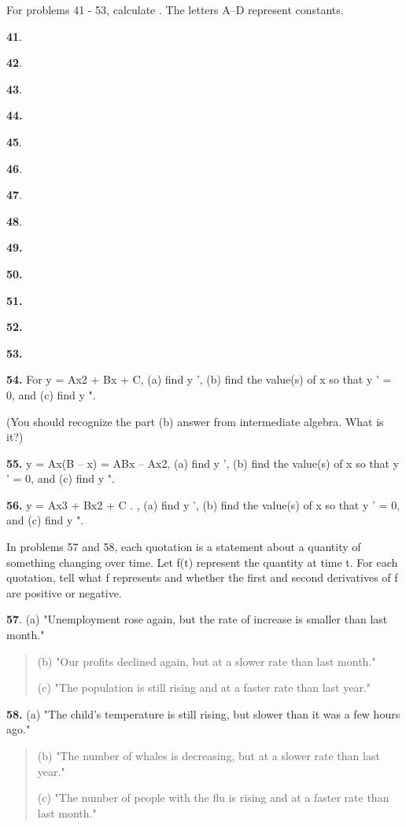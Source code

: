 For problems 41 - 53, calculate . The letters A--D represent constants.

\textbf{41}.

\textbf{42}.

\textbf{43}.

\textbf{44.}

\textbf{45}.

\textbf{46}.

\textbf{47}.

\textbf{48}.

\textbf{49.}

\textbf{50.}

\textbf{51.}

\textbf{52.}

\textbf{53.}

\textbf{54.} For y = Ax2 + Bx + C, (a) find y ', (b) find the value(s)
of x so that y ' = 0, and (c) find y ".

(You should recognize the part (b) answer from intermediate algebra.
What is it?)

\textbf{55.} y = Ax(B -- x) = ABx -- Ax2, (a) find y ', (b) find the
value(s) of x so that y ' = 0, and (c) find y ".

\textbf{56.} y = Ax3 + Bx2 + C . , (a) find y ', (b) find the value(s)
of x so that y ' = 0, and (c) find y ".

In problems 57 and 58, each quotation is a statement about a quantity of
something changing over time. Let f(t) represent the quantity at time t.
For each quotation, tell what f represents and whether the first and
second derivatives of f are positive or negative.

\textbf{57}. (a) "Unemployment rose again, but the rate of increase is
smaller than last month."

\begin{quote}
(b) "Our profits declined again, but at a slower rate than last month."

(c) "The population is still rising and at a faster rate than last
year."
\end{quote}

\textbf{58.} (a) "The child's temperature is still rising, but slower
than it was a few hours ago."

\begin{quote}
(b) "The number of whales is decreasing, but at a slower rate than last
year."

(c) "The number of people with the flu is rising and at a faster rate
than last month."
\end{quote}

